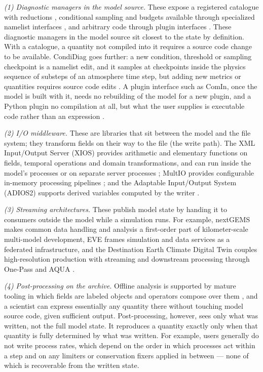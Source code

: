 \documentclass[gmd, manuscript]{copernicus}
\begin{document}
\emph{(1) Diagnostic managers in the model source.} These expose a registered catalogue with reductions \citep{valcke_flexible_2012,danabasoglu_community_2020,kern_diagnostic_2016,adams_lfric_2019}, conditional sampling and budgets available through specialized namelist interfaces \citep{wan_condidiag10_2022}, and arbitrary code through plugin interfaces \citep{hartung_icon_2025,kern_diagnostic_2016}. These diagnostic managers in the model source sit closest to the state by definition. With a catalogue, a quantity not compiled into it requires a source code change to be available. CondiDiag goes further: a new condition, threshold or sampling checkpoint is a namelist edit, and it samples at checkpoints inside the physics sequence of substeps of an atmosphere time step, but adding new metrics or quantities requires source code edits \citep{wan_condidiag10_2022}. A plugin interface such as ComIn, once the model is built with it, needs no rebuilding of the model for a new plugin, and a Python plugin no compilation at all, but what the user supplies is executable code rather than an expression \citep{hartung_icon_2025}.

\emph{(2) I/O middleware.} These are libraries that sit between the model and the file system; they transform fields on their way to the file (the write path). The XML Input/Output Server (XIOS) provides arithmetic and elementary functions on fields, temporal operations and domain transformations, and can run inside the model's processes or on separate server processes \citep{meurdesoif_xios_2017,yepes-arbos_evaluation_2022}; MultIO provides configurable in-memory processing pipelines \citep{sarmany_multio_2024}; and the Adaptable Input/Output System (ADIOS2) supports derived variables computed by the writer \citep{godoy_adios_2020}.

\emph{(3) Streaming architectures.} These publish model state by handing it to consumers outside the model while a simulation runs. For example, nextGEMS makes common data handling and analysis a first-order part of kilometer-scale multi-model development, EVE frames simulation and data services as a federated infrastructure, and the Destination Earth Climate Digital Twin couples high-resolution production with streaming and downstream processing through One-Pass and AQUA \citep{segura_nextgems_2025,stevens_earth_2024,doblas-reyes_destination_2026,grayson_statistical_2025,nurisso_aqua_2026}.

\emph{(4) Post-processing on the archive.} Offline analysis is supported by mature tooling in which fields are labeled objects and operators compose over them \citep{zender_analysis_2008,hoyer_xarray_2017,zhang_e3sm_2022}, and a scientist can express essentially any quantity there without touching model source code, given sufficient output. Post-processing, however, sees only what was written, not the full model state. It reproduces a quantity exactly only when that quantity is fully determined by what was written. For example, users generally do not write process rates, which depend on the order in which processes act within a step and on any limiters or conservation fixers applied in between --- none of which is recoverable from the written state.
\end{document}
